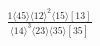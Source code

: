 \documentclass[varwidth, border=5pt]{standalone}
\begin{document}
\begin{my}
$\begin{gathered}
\scriptscriptstyle\frac{1⟨45⟩⟨12⟩^2⟨15⟩[13]}{⟨14⟩^3⟨23⟩⟨35⟩[35]}
\end{gathered}$
\end{my}
\end{document}
